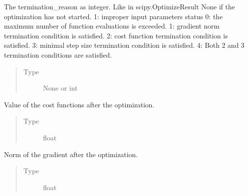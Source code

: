 \documentclass[letterpaper,10pt,english]{sphinxmanual}
\begin{document}
\begin{fulllineitems}
\begin{fulllineitems}
\end{fulllineitems}


\begin{fulllineitems}
\label{\detokenize{qsim:qsim.optimization_data.OptimizationResult.status}}
The termination\_reason as integer. Like in scipy.OptimizeResult
None if the optimization has not started.
\sphinxhyphen{}1: improper input parameters status
0: the maximum number of function evaluations is exceeded.
1: gradient norm termination condition is satisfied.
2: cost function termination condition is satisfied.
3: minimal step size termination condition is satisfied.
4: Both 2 and 3 termination conditions are satisfied.
\begin{quote}\begin{description}
\item[{Type}] \leavevmode
None or int

\end{description}\end{quote}

\end{fulllineitems}


\begin{fulllineitems}
\label{\detokenize{qsim:qsim.optimization_data.OptimizationResult.final_cost}}
Value of the cost functions after the optimization.
\begin{quote}\begin{description}
\item[{Type}] \leavevmode
float

\end{description}\end{quote}

\end{fulllineitems}


\begin{fulllineitems}
\label{\detokenize{qsim:qsim.optimization_data.OptimizationResult.final_grad_norm}}
Norm of the gradient after the optimization.
\begin{quote}\begin{description}
\item[{Type}] \leavevmode
float


\end{description}
\end{quote}
\end{fulllineitems}
\end{fulllineitems}
\end{document}
